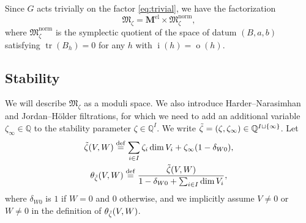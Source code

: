 \documentclass[pdftex]{sigma}
\theoremstyle{definition}
\numberwithin{equation}{section}
\newcommand{\defeq}{\overset{\operatorname{\scriptstyle def}}{=}}
\newcommand{\Q}{{\mathbb Q}}
\newcommand{\tr}{\operatorname{tr}}
\newcommand{\vin}[1]{\operatorname{i}(#1)} %
\newcommand{\vout}[1]{\operatorname{o}(#1)} %
\newcommand{\bM}{{\mathbf M}} %
\newcommand{\M}{{\mathfrak M}} %
\begin{document}
Since $G$ acts trivially on the factor \eqref{eq:trivial}, we have the
factorization
\begin{equation}\label{eq:fac}
    \M_\zeta = \bM^{\text{el}} \times \M_\zeta^{\text{norm}},
\end{equation}
where $\M_\zeta^{\text{norm}}$ is the symplectic quotient of the space
of datum $(B,a,b)$ satisfying $\tr(B_h) = 0$ for any $h$ with $\vin{h}
= \vout{h}$.

\subsection{Stability}\label{subsec:stability}

We will describe $\M_\zeta$ as a moduli space. We also introduce
Harder--Narasimhan and Jordan--H\"older f\/iltrations, for which we need
to add an additional variable $\zeta_\infty\in\Q$ to the stability
parameter $\zeta\in \Q^I$. We write $\Tilde\zeta =
(\zeta,\zeta_\infty) \in \Q^{I\sqcup\{\infty\}}$. Let
\begin{gather*}
 \Tilde\zeta(V,W)
   \defeq \sum_{i\in I} \zeta_{i} \dim V_i
   + \zeta_\infty (1-\delta_{W0}),
\\
 \theta_{\Tilde\zeta}(V,W)
   \defeq
   \frac{\Tilde\zeta(V,W)}{1 - \delta_{W0} + \sum_{i\in I} \dim V_i},
\end{gather*}
where $\delta_{W0}$ is $1$ if $W=0$ and $0$ otherwise, and we
implicitly assume $V\neq 0$ or $W\neq 0$ in the def\/inition of
$\theta_{\Tilde\zeta}(V,W)$.
\end{document}
